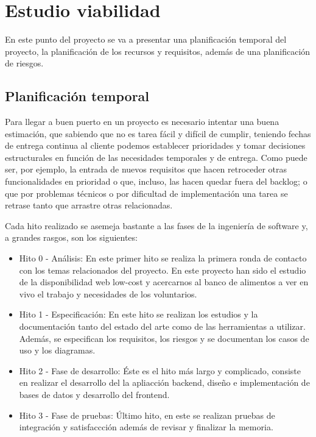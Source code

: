 
\chapter{Estudio viabilidad}
\label{estudioviabilidad}
En este punto del proyecto se va a presentar una planificación temporal del proyecto, la planificación de los recursos y requisitos, además de una planificación de riesgos.
\section{Planificación temporal}
Para llegar a buen puerto en un proyecto es necesario intentar una buena estimación, que sabiendo que no es tarea fácil y difícil de cumplir, teniendo fechas de entrega continua al cliente podemos establecer prioridades y tomar decisiones estructurales en función de las necesidades temporales y de entrega. Como puede ser, por ejemplo, la entrada de nuevos requisitos que hacen retroceder otras funcionalidades en prioridad o que, incluso, las hacen quedar fuera del backlog; o que por problemas técnicos o por dificultad de implementación una tarea se retrase tanto que arrastre otras relacionadas.
\vspace{1em}
\par Cada hito realizado se asemeja bastante a las fases de la ingeniería de software y, a grandes rasgos, son los siguientes:
\begin{itemize}
    \item Hito 0 - Análisis:
    En este primer hito se realiza la primera ronda de contacto con los temas relacionados del proyecto. En este proyecto han sido el estudio de la disponibilidad web low-cost y acercarnos al banco de alimentos a ver en vivo el trabajo y necesidades de los voluntarios.
    \item Hito 1 - Especificación:
    En este hito se realizan los estudios y la documentación tanto del estado del arte como de las herramientas a utilizar. Además, se especifican los requisitos, los riesgos y se documentan los casos de uso y los diagramas.
    \item Hito 2 - Fase de desarrollo:
    Éste es el hito más largo y complicado, consiste en realizar el desarrollo del la apliacción backend, diseño e implementación de bases de datos y desarrollo del frontend.
    \item Hito 3 - Fase de pruebas:
    Último hito, en este se realizan pruebas de integración y satisfaccción además de revisar y finalizar la memoria.
\end{itemize}
